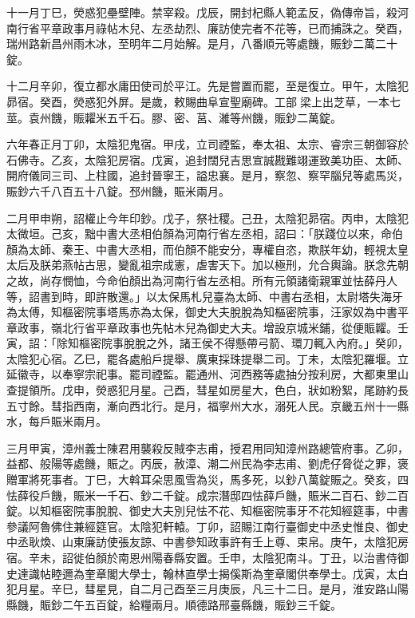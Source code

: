 \begin{pinyinscope}
 十一月丁巳，熒惑犯壘壁陣。禁宰殺。戊辰，開封杞縣人範孟反，偽傳帝旨，殺河南行省平章政事月祿帖木兒、左丞劫烈、廉訪使完者不花等，已而捕誅之。癸酉，瑞州路新昌州雨木冰，至明年二月始解。是月，八番順元等處饑，賑鈔二萬二十錠。



 十二月辛卯，復立都水庸田使司於平江。先是嘗置而罷，至是復立。甲午，太陰犯昴宿。癸酉，熒惑犯外屏。是歲，敕賜曲阜宣聖廟碑。工部梁上出芝草，一本七莖。袁州饑，賑糶米五千石。膠、密、莒、濰等州饑，賑鈔二萬錠。



 六年春正月丁卯，太陰犯鬼宿。甲戌，立司禋監，奉太祖、太宗、睿宗三朝御容於石佛寺。乙亥，太陰犯房宿。戊寅，追封闊兒吉思宣誠戡難翊運致美功臣、太師、開府儀同三司、上柱國，追封晉寧王，謚忠襄。是月，察忽、察罕腦兒等處馬災，賑鈔六千八百五十八錠。邳州饑，賑米兩月。



 二月甲申朔，詔權止今年印鈔。戊子，祭社稷。己丑，太陰犯昴宿。丙申，太陰犯太微垣。己亥，黜中書大丞相伯顏為河南行省左丞相，詔曰：「朕踐位以來，命伯顏為太師、秦王、中書大丞相，而伯顏不能安分，專權自恣，欺朕年幼，輕視太皇太后及朕弟燕帖古思，變亂祖宗成憲，虐害天下。加以極刑，允合輿論。朕念先朝之故，尚存憫恤，今命伯顏出為河南行省左丞相。所有元領諸衛親軍並怯薛丹人等，詔書到時，即許散還。」以太保馬札兒臺為太師、中書右丞相，太尉塔失海牙為太傅，知樞密院事塔馬赤為太保，御史大夫脫脫為知樞密院事，汪家奴為中書平章政事，嶺北行省平章政事也先帖木兒為御史大夫。增設京城米鋪，從便賑糶。壬寅，詔：「除知樞密院事脫脫之外，諸王侯不得懸帶弓箭、環刀輒入內府。」癸卯，太陰犯心宿。乙巳，罷各處船戶提舉、廣東採珠提舉二司。丁未，太陰犯羅堰。立延徽寺，以奉寧宗祀事。罷司禋監。罷通州、河西務等處抽分按利房，大都東里山查提領所。戊申，熒惑犯月星。己酉，彗星如房星大，色白，狀如粉絮，尾跡約長五寸餘。彗指西南，漸向西北行。是月，福寧州大水，溺死人民。京畿五州十一縣水，每戶賑米兩月。



 三月甲寅，漳州義士陳君用襲殺反賊李志甫，授君用同知漳州路總管府事。乙卯，益都、般陽等處饑，賑之。丙辰，赦漳、潮二州民為李志甫、劉虎仔脅從之罪，褒贈軍將死事者。丁巳，大斡耳朵思風雪為災，馬多死，以鈔八萬錠賑之。癸亥，四怯薛役戶饑，賑米一千石、鈔二千錠。成宗潛邸四怯薛戶饑，賑米二百石、鈔二百錠。以知樞密院事脫脫、御史大夫別兒怯不花、知樞密院事牙不花知經筵事，中書參議阿魯佛住兼經筵官。太陰犯軒轅。丁卯，詔賜江南行臺御史中丞史惟良、御史中丞耿煥、山東廉訪使張友諒、中書參知政事許有壬上尊、束帛。庚午，太陰犯房宿。辛未，詔徙伯顏於南恩州陽春縣安置。壬申，太陰犯南斗。丁丑，以治書侍御史達識帖睦邇為奎章閣大學士，翰林直學士揭傒斯為奎章閣供奉學士。戊寅，太白犯月星。辛巳，彗星見，自二月己酉至三月庚辰，凡三十二日。是月，淮安路山陽縣饑，賑鈔二午五百錠，給糧兩月。順德路邢臺縣饑，賑鈔三千錠。




\end{pinyinscope}
